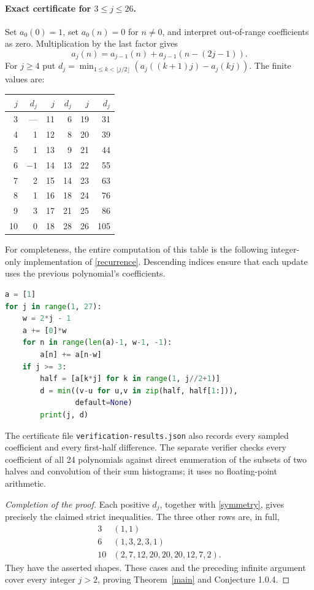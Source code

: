 \documentclass[11pt]{article}
\begin{document}
\newpage
\paragraph{Exact certificate for $3\le j\le26$.}
Set $a_0(0)=1$, set $a_0(n)=0$ for $n\ne0$, and interpret
out-of-range coefficients as zero. Multiplication by the last factor gives
\begin{equation}\label{recurrence}
 a_j(n)=a_{j-1}(n)+a_{j-1}(n-(2j-1)).
\end{equation}
For $j\ge4$ put
$d_j=\min_{1\le k<\lfloor j/2\rfloor}(a_j((k+1)j)-a_j(kj))$.
The finite values are:
\begin{center}
\begin{tabular}{rr@{\qquad\qquad}rr@{\qquad\qquad}rr}
\toprule
$j$ & $d_j$ & $j$ & $d_j$ & $j$ & $d_j$\\
\midrule
3 & --- & 11 & 6 & 19 & 31\\
4 & 1 & 12 & 8 & 20 & 39\\
5 & 1 & 13 & 9 & 21 & 44\\
6 & $-1$ & 14 & 13 & 22 & 55\\
7 & 2 & 15 & 14 & 23 & 63\\
8 & 1 & 16 & 18 & 24 & 76\\
9 & 3 & 17 & 21 & 25 & 86\\
10 & 0 & 18 & 28 & 26 & 105\\
\bottomrule
\end{tabular}
\end{center}
For completeness, the entire computation of this table is the following
integer-only implementation of \eqref{recurrence}. Descending indices
ensure that each update uses the previous polynomial's coefficients.
\begin{lstlisting}[language=Python]
a = [1]
for j in range(1, 27):
    w = 2*j - 1
    a += [0]*w
    for n in range(len(a)-1, w-1, -1):
        a[n] += a[n-w]
    if j >= 3:
        half = [a[k*j] for k in range(1, j//2+1)]
        d = min((v-u for u,v in zip(half, half[1:])),
                default=None)
        print(j, d)
\end{lstlisting}
The certificate file \texttt{verification-results.json} also records
every sampled coefficient and every first-half difference. The separate
verifier checks every coefficient of all 24 polynomials against direct
enumeration of the subsets of two halves and convolution of their sum
histograms; it uses no floating-point arithmetic.

\begin{proof}[Completion of the proof]
Each positive $d_j$, together with \eqref{symmetry}, gives precisely the
claimed strict inequalities. The three other rows are, in full,
\[
\begin{array}{c|l}
3 &(1,1)\\
6 &(1,3,2,3,1)\\
10&(2,7,12,20,20,20,12,7,2).
\end{array}
\]
They have the asserted shapes. These cases and the preceding infinite
argument cover every integer $j>2$, proving Theorem~\ref{main} and
Conjecture 1.0.4.
\end{proof}
\end{document}
